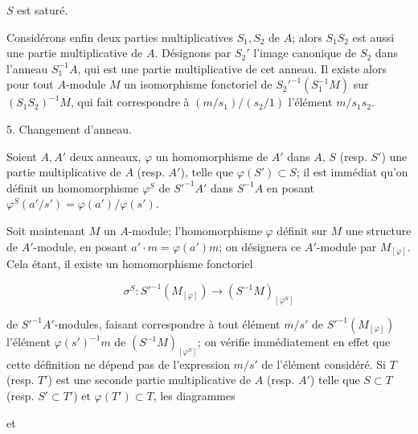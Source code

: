 \newpage


$S$ est saturé.

Considérons enfin deux parties multiplicatives $S_1, S_2$ de $A$; alors $S_1S_2$ est aussi une partie multiplicative de $A$. Désignons par $S_2'$ l'image canonique de $S_2$ dans l'anneau $S_1^{-1}A$, qui est une partie multiplicative de cet anneau. Il existe alors pour tout $A$-module $M$ un isomorphisme fonctoriel de $S_2'^{-1}(S_1^{-1}M)$ sur $(S_1S_2)^{-1}M$, qui fait correspondre à $(m/s_1)/(s_2/1)$ l'élément $m/s_1s_2$.

5. Changement d'anneau.

Soient $A, A'$ deux anneaux, $\varphi$ un homomorphisme de $A'$ dans $A$, $S$ (resp. $S'$) une partie multiplicative de $A$ (resp. $A'$), telle que $\varphi(S') \subset S$; il est immédiat qu'on définit un homomorphisme $\varphi^S$ de $S'^{-1}A'$ dans $S^{-1}A$ en posant $\varphi^S(a'/s') = \varphi(a')/\varphi(s')$.

Soit maintenant $M$ un $A$-module; l'homomorphisme $\varphi$ définit sur $M$ une structure de $A'$-module, en posant $a' \cdot m = \varphi(a')m$; on désignera ce $A'$-module par $M_{[\varphi]}$. Cela étant, il existe un homomorphisme fonctoriel

$$\sigma^S: S'^{-1}(M_{[\varphi]}) \to (S^{-1}M)_{[\varphi^S]}$$

de $S'^{-1}A'$-modules, faisant correspondre à tout élément $m/s'$ de $S'^{-1}(M_{[\varphi]})$ l'élément $\varphi(s')^{-1}m$ de $(S^{-1}M)_{[\varphi^S]}$; on vérifie immédiatement en effet que cette définition ne dépend pas de l'expression $m/s'$ de l'élément considéré. Si $T$ (resp. $T'$) est une seconde partie multiplicative de $A$ (resp. $A'$) telle que $S \subset T$ (resp. $S' \subset T'$) et $\varphi(T') \subset T$, les diagrammes

et

